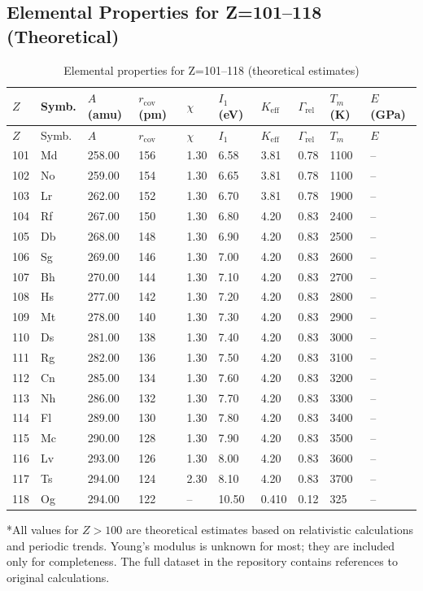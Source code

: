 \documentclass[12pt,a4paper]{article}
\newcommand{\Keff}{K_{\mathrm{eff}}}
\begin{document}
	\subsection*{Elemental Properties for Z=101–118 (Theoretical)}
	
	\begin{longtable}{p{0.6cm}p{1.2cm}p{1.2cm}p{1.2cm}p{1.2cm}p{1.2cm}p{1.5cm}p{1.2cm}p{1.2cm}p{1.2cm}}
		\caption{Elemental properties for Z=101–118 (theoretical estimates)} \label{tab:elem-data-101to118} \\
		\toprule
		\(Z\) & Symb. & \(A\) (amu) & \(r_{\text{cov}}\) (pm) & \(\chi\) & \(I_1\) (eV) & \(\Keff\) & \(\Gamma_{\text{rel}}\) & \(T_m\) (K) & \(E\) (GPa) \\
		\midrule
		\endfirsthead
		\toprule
		\(Z\) & Symb. & \(A\) & \(r_{\text{cov}}\) & \(\chi\) & \(I_1\) & \(\Keff\) & \(\Gamma_{\text{rel}}\) & \(T_m\) & \(E\) \\
		\midrule
		\endhead
		101 & Md & 258.00 & 156 & 1.30 & 6.58 & 3.81 & 0.78 & 1100 & – \\
		102 & No & 259.00 & 154 & 1.30 & 6.65 & 3.81 & 0.78 & 1100 & – \\
		103 & Lr & 262.00 & 152 & 1.30 & 6.70 & 3.81 & 0.78 & 1900 & – \\
		104 & Rf & 267.00 & 150 & 1.30 & 6.80 & 4.20 & 0.83 & 2400 & – \\
		105 & Db & 268.00 & 148 & 1.30 & 6.90 & 4.20 & 0.83 & 2500 & – \\
		106 & Sg & 269.00 & 146 & 1.30 & 7.00 & 4.20 & 0.83 & 2600 & – \\
		107 & Bh & 270.00 & 144 & 1.30 & 7.10 & 4.20 & 0.83 & 2700 & – \\
		108 & Hs & 277.00 & 142 & 1.30 & 7.20 & 4.20 & 0.83 & 2800 & – \\
		109 & Mt & 278.00 & 140 & 1.30 & 7.30 & 4.20 & 0.83 & 2900 & – \\
		110 & Ds & 281.00 & 138 & 1.30 & 7.40 & 4.20 & 0.83 & 3000 & – \\
		111 & Rg & 282.00 & 136 & 1.30 & 7.50 & 4.20 & 0.83 & 3100 & – \\
		112 & Cn & 285.00 & 134 & 1.30 & 7.60 & 4.20 & 0.83 & 3200 & – \\
		113 & Nh & 286.00 & 132 & 1.30 & 7.70 & 4.20 & 0.83 & 3300 & – \\
		114 & Fl & 289.00 & 130 & 1.30 & 7.80 & 4.20 & 0.83 & 3400 & – \\
		115 & Mc & 290.00 & 128 & 1.30 & 7.90 & 4.20 & 0.83 & 3500 & – \\
		116 & Lv & 293.00 & 126 & 1.30 & 8.00 & 4.20 & 0.83 & 3600 & – \\
		117 & Ts & 294.00 & 124 & 2.30 & 8.10 & 4.20 & 0.83 & 3700 & – \\
		118 & Og & 294.00 & 122 & –    & 10.50 & 0.410 & 0.12 & 325 & – \\
		\bottomrule
	\end{longtable}
	*All values for \(Z>100\) are theoretical estimates based on relativistic calculations and periodic trends. Young’s modulus is unknown for most; they are included only for completeness. The full dataset in the repository contains references to original calculations.
	
\end{document}
